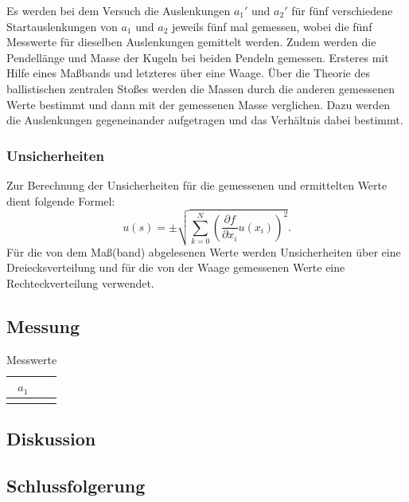 		Es werden bei dem Versuch die Auslenkungen $a_1'$ und $a_2'$ für fünf verschiedene Startauslenkungen von $a_1$ und $a_2$ jeweils fünf mal gemessen, wobei die fünf Messwerte für dieselben Auslenkungen gemittelt werden.
		Zudem werden die Pendellänge und Masse der Kugeln bei beiden Pendeln gemessen. Ersteres mit Hilfe eines Maßbands und letzteres über eine Waage.	
		Über die Theorie des ballistischen zentralen Stoßes werden die Massen durch die anderen gemessenen Werte bestimmt und dann mit der gemessenen Masse verglichen. Dazu werden die Auslenkungen gegeneinander aufgetragen und das Verhältnis dabei bestimmt.
				
		\subsubsection{Unsicherheiten}
		
			Zur Berechnung der Unsicherheiten für die gemessenen und ermittelten Werte dient folgende Formel: 
			\begin{equation*}
				u(s) = \pm \sqrt{\sum_{k=0}^{N}\left( \frac{\partial f}{\partial x_i}u(x_i)\right) ^2}. \label{eq:kombUnsicherheit}
			\end{equation*}
			Für die von dem Maß(band) abgelesenen Werte werden Unsicherheiten über eine Dreiecksverteilung und für die von der Waage gemessenen Werte eine Rechteckverteilung verwendet. 
	
	\subsection{Messung}
		
		\begin{table}[ht]
			\caption{Messwerte}
			\centering
			\label{tab:Messwerte}
			\begin{tabular}{c|c}
				{$a_1$} & {}	\\
				\hline
				{}		& {}	\\
				
			\end{tabular}
		\end{table}
	\subsection{Diskussion}
	
	\subsection{Schlussfolgerung}